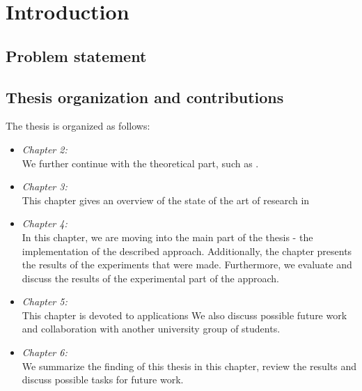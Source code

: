 %
%


\chapter{Introduction}
\label{sec:introduction}



\section{Problem statement}
\section{Thesis organization and contributions}

The thesis is organized as follows:
\begin{itemize}

\item[] \emph{Chapter 2:} 
\\We further continue with the theoretical part, such as .


\item[] \emph{Chapter 3:}
\\This chapter gives an overview of the state of the art of research in 


\item[] \emph{Chapter 4:} 
\\In this chapter, we are moving into the main part of the thesis - the implementation of the described approach. Additionally, the chapter presents the results of the experiments that were made. Furthermore, we evaluate and discuss the results of the experimental part of the approach.

\item[] \emph{Chapter 5:} 
\\This chapter is devoted to applications  We also discuss possible future work and collaboration with another university group of students.

\item[] \emph{Chapter 6:} 
\\We summarize the finding of  this thesis in this chapter, review the results and discuss possible tasks for future work.

\end{itemize}


